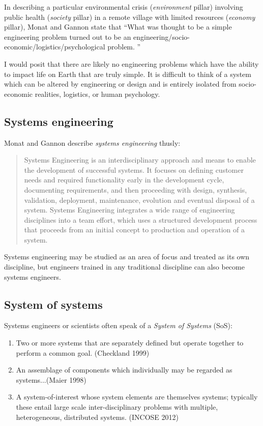 \documentclass[10pt]{article}
\begin{document}
In describing a particular environmental crisis (\textit{environment} pillar) involving public health (\textit{society} pillar) in a remote village with limited resources (\textit{economy} pillar), Monat and Gannon state that ``What was thought to be a simple engineering problem turned out to be an engineering/socio-economic/logistics/psychological problem. \cite{Monat2018}'' 

I would posit that there are likely no engineering problems which have the ability to impact life on Earth that are truly simple. It is difficult to think of a system which can be altered by engineering or design and is entirely isolated from socio-economic realities, logistics, or human psychology.

\subsection{Systems engineering}

Monat and Gannon describe \textit{systems engineering} thusly:

\begin{quotation}
    Systems Engineering is an interdisciplinary approach and means to enable the development of successful systems.  It focuses on defining customer needs and required functionality early in the development cycle, documenting requirements, and then proceeding with design, synthesis, validation, deployment,  maintenance,  evolution  and  eventual  disposal  of  a  system.   Systems  Engineering integrates  a  wide  range  of  engineering  disciplines  into  a  team  effort,  which  uses  a  structured development process that proceeds from an initial concept to production and operation of a system.
\end{quotation}

Systems engineering may be studied as an area of focus and treated as its own discipline, but engineers trained in any traditional discipline can also become systems engineers.


\subsection{System of systems}

Systems engineers or scientists often speak of a \textit{System of Systems} (SoS):

\begin{enumerate}
    \item Two or more systems that are separately defined but operate together to perform a common goal. (Checkland 1999) \cite{noauthor_undated-vl}
    \item An assemblage of components which individually may be regarded as systems...(Maier 1998) \cite{noauthor_undated-vl}
    \item A system-of-interest whose system elements are themselves systems; typically these entail large scale inter-disciplinary problems with multiple, heterogeneous, distributed systems. (INCOSE 2012) \cite{noauthor_undated-vl}
\end{enumerate}
\end{document}
